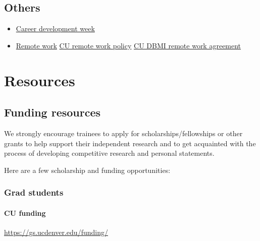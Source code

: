 \documentclass[
  letterpaper,
  DIV=11,
  numbers=noendperiod]{scrreprt}
\providecommand{\tightlist}{%
  \setlength{\itemsep}{0pt}\setlength{\parskip}{0pt}}\usepackage{longtable,booktabs,array}
\begin{document}
\hypertarget{others}{%
\section{Others}\label{others}}

\begin{itemize}
\tightlist
\item
  \href{https://github.com/JRaviLab/group/blob/master/docs/career_dev_week.md}{Career
  development week}
\item
  \href{https://github.com/JRaviLab/group/blob/master/docs/howto_work_remotely.md}{Remote
  work} \textbar{}
  \href{https://www.ucdenver.edu/docs/librariesprovider284/default-document-library/4000-human-resources/4032---alternative-schedules-and-remote-work-arrangements.pdf?sfvrsn=3ee7f3ba_2}{CU
  remote work policy} \textbar{}
  \href{https://app.smartsheet.com/b/form/f5c5dd3f01dc4eefb3711a4fce6955fe}{CU
  DBMI remote work agreement}
\end{itemize}


\hypertarget{resources}{%
\chapter{Resources}\label{resources}}

\hypertarget{funding-resources}{%
\section{Funding resources}\label{funding-resources}}

We strongly encourage trainees to apply for scholarships/fellowships or
other grants to help support their independent research and to get
acquainted with the process of developing competitive research and
personal statements.

Here are a few scholarship and funding opportunities:

\hypertarget{grad-students}{%
\subsection{Grad students}\label{grad-students}}

\hypertarget{cu-funding}{%
\subsubsection{CU funding}\label{cu-funding}}

\url{https://gs.ucdenver.edu/funding/}
\end{document}
